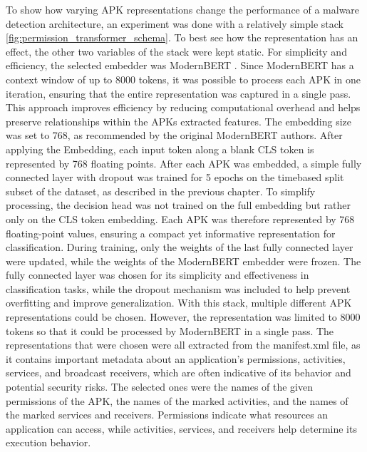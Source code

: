 To show how varying APK representations change the performance of a malware detection 
architecture, an experiment was done with a relatively simple stack 
\ref{fig:permission_transformer_schema}. 
To best see how the representation has an effect, 
the other two variables of the stack were kept static. 
For simplicity and efficiency, the selected embedder was ModernBERT \cite{modernbert}. 
Since ModernBERT has a context window of up to 8000 tokens, 
it was possible to process each APK in one iteration, 
ensuring that the entire representation was captured in a single pass. 
This approach improves efficiency by reducing computational overhead and helps preserve 
relationships within the APKs extracted features. 
The embedding size was set to 768, as recommended by the original ModernBERT authors. 
After applying the Embedding, each input token along a blank CLS token is represented
by 768 floating points.
After each APK was embedded, a simple fully connected layer with dropout was 
trained for 5 epochs on the timebased 
split subset of the dataset, as described in the previous chapter. 
To simplify processing, the decision head was not trained on the full 
embedding but rather only on the CLS token embedding. Each APK was therefore 
represented by 768 floating-point values, ensuring a compact yet 
informative representation for classification.
During training, only the weights of the last fully connected layer were updated, 
while the weights of the ModernBERT embedder were frozen.
The fully connected layer was chosen for its simplicity and effectiveness in 
classification tasks, while the dropout mechanism was included to help prevent overfitting 
and improve generalization. With this stack, 
multiple different APK representations could be chosen. 
However, the representation was limited to 8000 tokens so that it could be 
processed by ModernBERT in a single pass. 
The representations that were chosen were all extracted from the manifest.xml file, 
as it contains important metadata about an application's permissions, activities, services, 
and broadcast receivers, which are often indicative of its behavior and potential security risks. 
The selected ones were the names of the given permissions of the APK, 
the names of the marked activities, 
and the names of the marked services and receivers. 
Permissions indicate what resources an application can access, 
while activities, services, and receivers help determine its execution behavior. 

